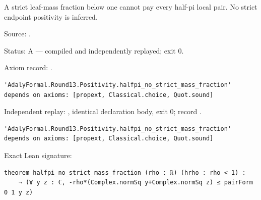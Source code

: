 \begin{theorem}[bp-462]
\label{bp-462}
\uses{}
\leanok
A strict leaf-mass fraction below one cannot pay every half-pi local pair. No strict endpoint positivity is inferred.

\par Source: \texttt{}.
\par Status: A — compiled and independently replayed; exit 0.
\par Axiom record: \texttt{}.
\begin{verbatim}
'AdalyFormal.Round13.Positivity.halfpi_no_strict_mass_fraction' depends on axioms: [propext, Classical.choice, Quot.sound]
\end{verbatim}
\par Independent replay: \texttt{}, identical declaration body, exit 0; record \texttt{}.
\begin{verbatim}
'AdalyFormal.Round13.Positivity.halfpi_no_strict_mass_fraction' depends on axioms: [propext, Classical.choice, Quot.sound]
\end{verbatim}
\par Exact Lean signature:
\begin{verbatim}
theorem halfpi_no_strict_mass_fraction (rho : ℝ) (hrho : rho < 1) :
    ¬ (∀ y z : ℂ, -rho*(Complex.normSq y+Complex.normSq z) ≤ pairForm 0 1 y z)
\end{verbatim}
\end{theorem}

